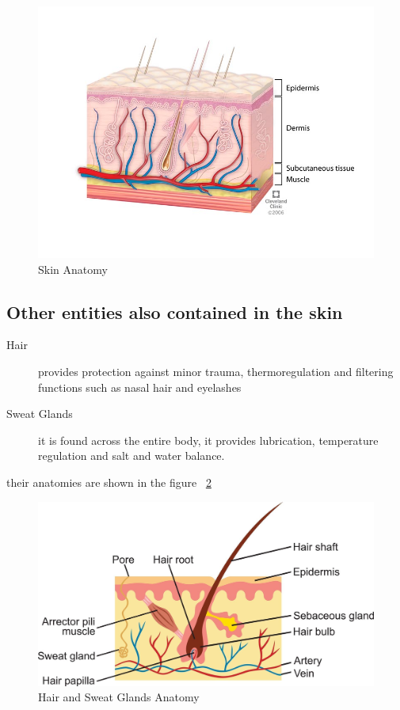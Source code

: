\begin{figure}[htbp]
\begin{center}
\includegraphics[width=15cm]{./chapter-01-general-medical-information/skin-anatomy.jpg}
\end{center}
\caption{Skin Anatomy ~\cite{fig-skin}}
\label{fig:skin}
\end{figure}

\subsection{Other entities also contained in the skin}
\begin{description}
\item[Hair]  provides protection against minor trauma, thermoregulation and filtering functions such as nasal hair and eyelashes
\item[Sweat Glands] it is found across the entire body, it provides lubrication, temperature regulation and salt and water balance.
\end{description}
their anatomies are shown in the figure ~\ref{fig:hair}

\begin{figure}[htbp]
\begin{center}
\includegraphics[width=15cm]{./chapter-01-general-medical-information/hair-sweat-gland.jpg}
\end{center}
\caption{Hair and Sweat Glands Anatomy ~\cite{fig-hair}}
\label{fig:hair}
\end{figure}


